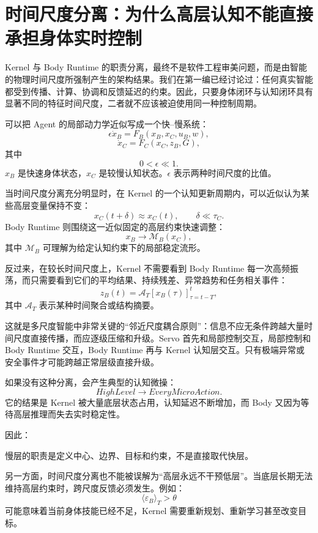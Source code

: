 \section{时间尺度分离：为什么高层认知不能直接承担身体实时控制}

Kernel 与 Body Runtime 的职责分离，最终不是软件工程审美问题，而是由智能的物理时间尺度所强制产生的架构结果。我们在第一编已经讨论过：任何真实智能都受到传播、计算、协调和反馈延迟的约束。因此，只要身体闭环与认知闭环具有显著不同的特征时间尺度，二者就不应该被迫使用同一种控制周期。

可以把 Agent 的局部动力学近似写成一个快--慢系统：
\[
\epsilon \dot x_B
=
F_B(x_B,x_C,u_B,w),
\]
\[
\dot x_C
=
F_C(x_C,z_B,G),
\]
其中
\[
0<\epsilon\ll1.
\]
$x_B$ 是快速身体状态，$x_C$ 是较慢认知状态。$\epsilon$ 表示两种时间尺度的比值。

当时间尺度分离充分明显时，在 Kernel 的一个认知更新周期内，可以近似认为某些高层变量保持不变：
\[
x_C(t+\delta)
\approx
x_C(t),
\qquad
\delta\ll\tau_C.
\]
Body Runtime 则围绕这一近似固定的高层约束快速调整：
\[
x_B
\rightarrow
\mathcal M_B(x_C),
\]
其中 $\mathcal M_B$ 可理解为给定认知约束下的局部稳定流形。

反过来，在较长时间尺度上，Kernel 不需要看到 Body Runtime 每一次高频振荡，而只需要看到它们的平均结果、持续残差、异常趋势和任务相关事件：
\[
z_B(t)
=
\mathcal A_T
\left[
x_B(\tau)
\right]_{\tau=t-T}^{t},
\]
其中 $\mathcal A_T$ 表示某种时间聚合或结构摘要。

这就是多尺度智能中非常关键的“邻近尺度耦合原则”：信息不应无条件跨越大量时间尺度直接传播，而应逐级压缩和升级。Servo 首先和局部控制交互，局部控制和 Body Runtime 交互，Body Runtime 再与 Kernel 认知层交互。只有极端异常或安全事件才可能跨越正常层级直接升级。

如果没有这种分离，会产生典型的认知微操：
\[
HighLevel
\rightarrow
EveryMicroAction.
\]
它的结果是 Kernel 被大量底层状态占用，认知延迟不断增加，而 Body 又因为等待高层推理而失去实时稳定性。

因此：
\begin{statementbox}
\centering
{}
\end{statementbox}

慢层的职责是定义中心、边界、目标和约束，不是直接取代快层。

另一方面，时间尺度分离也不能被误解为“高层永远不干预低层”。当底层长期无法维持高层约束时，跨尺度反馈必须发生。例如：
\[
\langle\varepsilon_B\rangle_T
>
\theta
\]
可能意味着当前身体技能已经不足，Kernel 需要重新规划、重新学习甚至改变目标。

